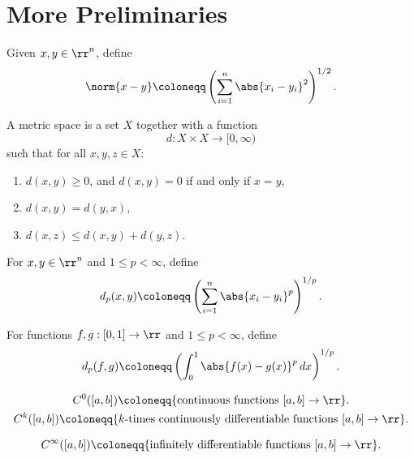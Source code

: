 
\section{More Preliminaries}


\begin{definition}
    Given $x,y\in\rr^n$, define
    \[
        \norm{x-y} \coloneqq \left(\sum_{i=1}^n \abs{x_i - y_i}^2\right)^{1/2}.
    \]
\end{definition}

\begin{definition}
    A metric space is a set $X$ together with a function
    \[
        d:X\times X\to[0,\infty)
    \]
    such that for all $x,y,z\in X$:
    \begin{enumerate}
        \item $d(x,y)\geq 0$, and $d(x,y)=0$ if and only if $x=y$,
        \item $d(x,y)=d(y,x)$,
        \item $d(x,z)\leq d(x,y)+d(y,z)$.
    \end{enumerate}
\end{definition}

\begin{example}
    For $x,y\in\rr^n$ and $1\leq p<\infty$, define
    \[
        d_p(x,y) \coloneqq \left(\sum_{i=1}^n \abs{x_i - y_i}^p\right)^{1/p}.
    \]
\end{example}

\begin{example}[$L^p$-metric]
    For functions $f,g:[0,1]\to\rr$ and $1\leq p<\infty$, define
    \[
        d_p(f,g) \coloneqq \left(\int_0^1 \abs{f(x) - g(x)}^p\,dx\right)^{1/p}.
    \]
\end{example}

\begin{definition}
    \begin{gather*}
        C^0([a,b]) \coloneqq \{\text{continuous functions } [a,b]\to\rr\}.\\
        C^k([a,b]) \coloneqq \{\text{$k$-times continuously differentiable functions } [a,b]\to\rr\}.\\
    \end{gather*}
\end{definition}

\begin{definition}
    \[
        C^\infty([a,b]) \coloneqq \{\text{infinitely differentiable functions } [a,b]\to\rr\}.
    \]
\end{definition}

